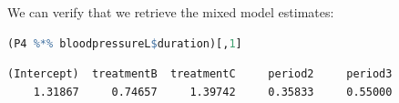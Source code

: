 \documentclass[12pt]{article}
\begin{document}
\noindent We can verify that we retrieve the mixed model estimates:
\begin{lstlisting}[language=r,numbers=none]
(P4 %*% bloodpressureL$duration)[,1]
\end{lstlisting}

\label{}
\begin{verbatim}
(Intercept)  treatmentB  treatmentC     period2     period3 
    1.31867     0.74657     1.39742     0.35833     0.55000
\end{verbatim}
\end{document}
